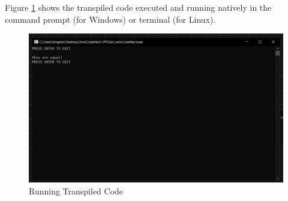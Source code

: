 \parx
Figure \ref{fig:cn_run} shows the transpiled code executed and running natively in the
command prompt (for Windows) or terminal (for Linux).

\begin{figure}[H]
	\centering
	\captionsetup{justification=centering}
	\captionsetup[figure]{list=yes}
	\includegraphics[width=\linewidth]{media/sc_run.png}
	\caption[Running Transpiled Code]{Running Transpiled Code}
	\label{fig:cn_run}
\end{figure}
